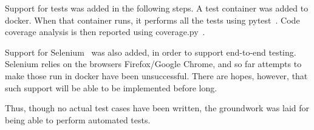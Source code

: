 Support for tests was added in the following steps. A test container was added to docker. When that container runs, it performs all the tests using pytest~\cite{pytest}. Code coverage analysis is then reported using coverage.py~\cite{coverage}. 

Support for Selenium~\cite{selenium} was also added, in order to support end-to-end testing. Selenium relies on the browsers Firefox/Google Chrome, and so far attempts to make those run in docker have been unsuccessful. There are hopes, however, that such support will be able to be implemented before long.

Thus, though no actual test cases have been written, the groundwork was laid for being able to perform automated tests.

\newpage